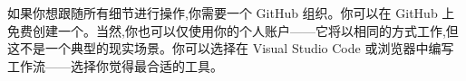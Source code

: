 如果你想跟随所有细节进行操作,你需要一个 GitHub 组织。你可以在 GitHub 上免费创建一个。当然,你也可以仅使用你的个人账户——它将以相同的方式工作,但这不是一个典型的现实场景。你可以选择在 Visual Studio Code 或浏览器中编写工作流——选择你觉得最合适的工具。